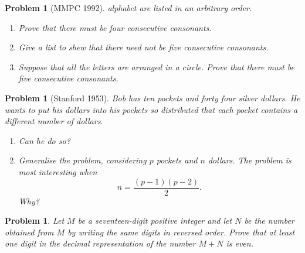 \documentclass[11pt, openany]{book}
\theoremstyle{change} \theoremheaderfont{\blue\sffamily\bfseries}
\newtheorem{pro}[thm]{Problem}
\theoremstyle{nonumberplain} \theoremheaderfont{\sffamily\bfseries}
\newcommand{\í}{\'{\i}}
\begin{document}
\begin{multicols}{2}
\begin{pro}[MMPC 1992]
alphabet are listed in an arbitrary order. \begin{enumerate} \item
Prove that there must be four consecutive consonants. \item Give a
list to shew that there need not be five consecutive consonants.
\item Suppose that all the letters are arranged in a circle. Prove
that there must be five consecutive consonants.
\end{enumerate}
\end{pro}
\begin{pro}[Stanford 1953] Bob has ten pockets and forty four silver
dollars. He wants to put his dollars into his pockets so
distributed that each pocket contains a different number of
dollars.
\begin{enumerate}\item Can he do so? \item Generalise the problem, considering $p$ pockets
and $n$ dollars. The problem is most interesting when $$ n =
\frac{(p - 1)(p - 2)}{2}.$$ Why? \end{enumerate} \end{pro}
\begin{pro}
Let $M$ be a seventeen-digit positive integer and let $N$ be the
number obtained from $M$ by writing the same digits in reversed
order. Prove that at least one digit in the decimal representation
of the number $M + N$ is even.
\end{pro}


\end{multicols}
\end{document}
